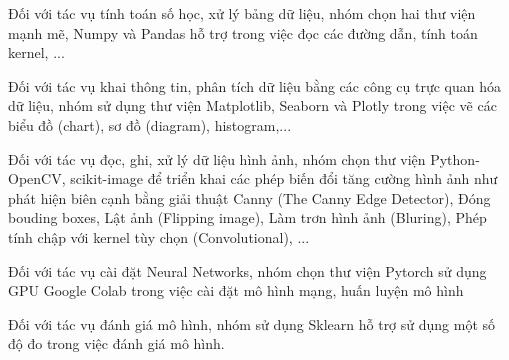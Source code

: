 \documentclass{article}
\begin{document}
	Đối với tác vụ tính toán số học, xử lý bảng dữ liệu, nhóm chọn hai thư viện mạnh mẽ, Numpy và Pandas hỗ trợ trong việc đọc các đường dẫn, tính toán kernel, ...
	
	Đối với tác vụ khai thông tin, phân tích dữ liệu bằng các công cụ trực quan hóa dữ liệu, nhóm sử dụng thư viện Matplotlib, Seaborn và Plotly trong việc vẽ các biểu đồ (chart), sơ đồ (diagram), histogram,...
	
	Đối với tác vụ đọc, ghi, xử lý dữ liệu hình ảnh, nhóm chọn thư viện Python-OpenCV, scikit-image để triển khai các phép biến đổi tăng cường hình ảnh như phát hiện biên cạnh bằng giải thuật Canny (The Canny Edge Detector), Đóng bouding boxes, Lật ảnh (Flipping image), Làm trơn hình ảnh (Bluring), Phép tính chập với kernel tùy chọn (Convolutional), ...
	
	Đối với tác vụ cài đặt Neural Networks, nhóm chọn thư viện Pytorch sử dụng GPU Google Colab trong việc cài đặt mô hình mạng, huấn luyện mô hình
	
	Đối với tác vụ đánh giá mô hình, nhóm sử dụng Sklearn hỗ trợ sử dụng một số độ đo trong việc đánh giá mô hình.
	
\end{document}
